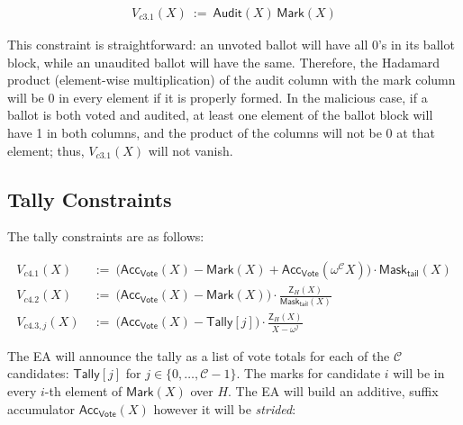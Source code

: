 \begin{mdframed}[linewidth=0.6pt,backgroundcolor=verylightpink,innerleftmargin=6pt,innerrightmargin=6pt,innertopmargin=4pt,innerbottommargin=4pt]
\[
\begin{aligned}
V_{c3.1}(X)\ :=\ \mathsf{Audit}(X)\,\mathsf{Mark}(X)
\end{aligned}
\]
\end{mdframed}

 This constraint is straightforward: an unvoted ballot will have all 0's in its ballot block, while an unaudited ballot will have the same. Therefore, the Hadamard product (element-wise multiplication) of the audit column with the mark column will be 0 in every element if it is properly formed. In the malicious case, if a ballot is both voted and audited, at least one element of the ballot block will have 1 in both columns, and the product of the columns will not be 0 at that element; thus, $V_{c3.1}(X)$ will not vanish.


\subsection{Tally Constraints}
\label{sec:tally}

The tally constraints are as follows:

\begin{mdframed}[linewidth=0.6pt,backgroundcolor=verylightpink,innerleftmargin=6pt,innerrightmargin=6pt,innertopmargin=4pt,innerbottommargin=4pt]
\[
\begin{aligned}
V_{c4.1}(X)\ &:=\ \bigl(\mathsf{Acc}_{\mathsf{Vote}}(X)-\mathsf{Mark}(X)+\mathsf{Acc}_{\mathsf{Vote}}(\omega^{\mathcal{C}}X)\bigr)\cdot \mathsf{Mask}_{\mathsf{tail}}(X) \\
V_{c4.2}(X)\ &:=\ \bigl(\mathsf{Acc}_{\mathsf{Vote}}(X)-\mathsf{Mark}(X)\bigr)\cdot \frac{\mathsf{Z}_H(X)}{\mathsf{Mask}_{\mathsf{tail}}(X)}\\
V_{c4.3,j}(X)\ &:=\ \bigl(\mathsf{Acc}_{\mathsf{Vote}}(X)-\mathsf{Tally}[j]\bigr)\cdot \frac{\mathsf{Z}_H(X)}{X-\omega^{j}}
\end{aligned}
\]
\end{mdframed}

 The EA will announce the tally as a list of vote totals for each of the $\mathcal{C}$ candidates: $\mathsf{Tally}[j]$ for $j\in\{0,\ldots,\mathcal{C}-1\}$. The marks for candidate $i$ will be in every $i$-th element of $\mathsf{Mark}(X)$ over $H$. The EA will build an additive, suffix accumulator $\mathsf{Acc}_{\mathsf{Vote}}(X)$ however it will be \textit{strided}:

